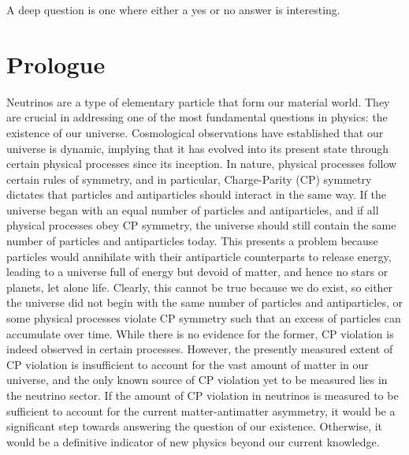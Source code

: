 \begin{savequote}[8cm]
\textlatin{A deep question is one where either a yes or no answer is interesting.}

\end{savequote}

\chapter{\label{ch:intro}Prologue} 

\minitoc

Neutrinos are a type of elementary particle that form our material world. 
They are crucial in addressing one of the most fundamental questions in physics: the existence of our universe. 
Cosmological observations have established that our universe is dynamic, implying that it has evolved into its present state through certain physical processes since its inception.
In nature, physical processes follow certain rules of symmetry, and in particular, Charge-Parity (CP) symmetry dictates that particles and antiparticles should interact in the same way. 
If the universe began with an equal number of particles and antiparticles, and if all physical processes obey CP symmetry, the universe should still contain the same number of particles and antiparticles today.
This presents a problem because particles would annihilate with their antiparticle counterparts to release energy, leading to a universe full of energy but devoid of matter, and hence no stars or planets, let alone life.
Clearly, this cannot be true because we do exist, so either the universe did not begin with the same number of particles and antiparticles, or some physical processes violate CP symmetry such that an excess of particles can accumulate over time. 
While there is no evidence for the former, CP violation is indeed observed in certain processes. 
However, the presently measured extent of CP violation is insufficient to account for the vast amount of matter in our universe, and the only known source of CP violation yet to be measured lies in the neutrino sector. 
If the amount of CP violation in neutrinos is measured to be sufficient to account for the current matter-antimatter asymmetry, it would be a significant step towards answering the question of our existence. 
Otherwise, it would be a definitive indicator of new physics beyond our current knowledge.

